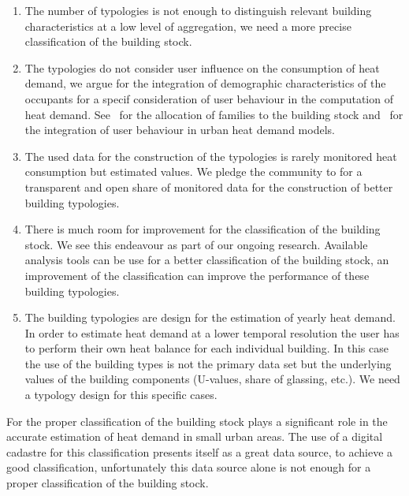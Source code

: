 \documentclass[authoryear,preprint,review,12pt]{elsarticle}
\begin{document}
\begin{linenumbers}
\begin{enumerate}
    \item The number of typologies is not enough to distinguish relevant
        building characteristics at a low level of aggregation, we need a more
        precise classification of the building stock.
    \item The typologies do not consider user influence on the consumption of
        heat demand, we argue for the integration of demographic
        characteristics of the occupants for a specif consideration of user
        behaviour in the computation of heat demand.
        See~\cite{MunozHidalgoPeters.2014} for the allocation of families to
        the building stock and~\cite{MunozHidalgo.2014} for the integration of
        user behaviour in urban heat demand models.
    \item The used data for the construction of the typologies is rarely
        monitored heat consumption but estimated values. We pledge the
        community to for a transparent and open share of monitored data for the
        construction of better building typologies.
    \item There is much room for improvement for the classification of the
        building stock. We see this endeavour as part of our ongoing research.
        Available analysis tools can be use for a better classification of the
        building stock, an improvement of the classification can improve the
        performance of these building typologies.
    \item The building typologies are design for the estimation of yearly heat
        demand. In order to estimate heat demand at a lower temporal resolution
        the user has to perform their own heat balance for each individual
        building. In this case the use of the building types is not the
        primary data set but the underlying values of the building components
        (U-values, share of glassing, etc.). We need a typology design for this
        specific cases.
\end{enumerate}

For the proper classification of the building stock plays a significant role in
the accurate estimation of heat demand in small urban areas. The use of a
digital cadastre for this classification presents itself as a great data
source, to achieve a good classification, unfortunately this data source alone
is not enough for a proper classification of the building stock.\\


\end{linenumbers}
\end{document}

